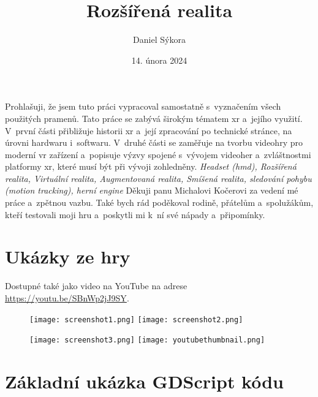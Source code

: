 \documentclass[12pt]{report}
\author{Daniel Sýkora}
\title{Rozšířená realita}
\date{14. února 2024}
\begin{document}
\mytitlepage
\prohlaseni
{
	Prohlašuji, že jsem tuto práci vypracoval samostatně s~vyznačením všech použitých pramenů.
}
\abstrakt
{ %
	Tato práce se zabývá širokým tématem \gls{xr} a~jejího využití. V~první části přibližuje historii \gls{xr} a~její zpracování po technické stránce, na úrovni hardwaru i~softwaru. V~druhé části se zaměřuje na tvorbu videohry pro moderní \gls{vr} zařízení a~popisuje výzvy spojené s~vývojem videoher a~zvláštnostmi platformy \gls{xr}, které musí být při vývoji zohledněny.
}
{ %
	\textit{Headset (\gls{hmd}), Rozšířená realita, Virtuální realita, Augmentovaná realita, Smíšená realita, sledování pohybu (motion tracking), herní engine}
}
\podekovani
{
	Děkuji panu Michalovi Kočerovi za vedení mé práce a~zpětnou vazbu. Také bych rád poděkoval rodině, přátelům a~spolužákům, kteří testovali moji hru a~poskytli mi k~ní své nápady a~připomínky.
}

\tableofcontents
\newpage






\nocite{*}

\printbibliography

\printglossary[title={Zkratky}]

\listoffigures
{}

\appendix

\chapter{Ukázky ze hry}\label{apx_screenshots}
Dostupné také jako video na YouTube na adrese \url{https://youtu.be/SBnWp2jJ9SY}.
\begin{figure}[H]
	\centering
	\texttt{[image: screenshot1.png]}
	\texttt{[image: screenshot2.png]}
\end{figure}
\begin{figure}[H]
	\centering
	\texttt{[image: screenshot3.png]}
	\texttt{[image: youtubethumbnail.png]}
\end{figure}

\chapter{Základní ukázka GDScript kódu}\label{apx_gscript_sample}

\end{document}
